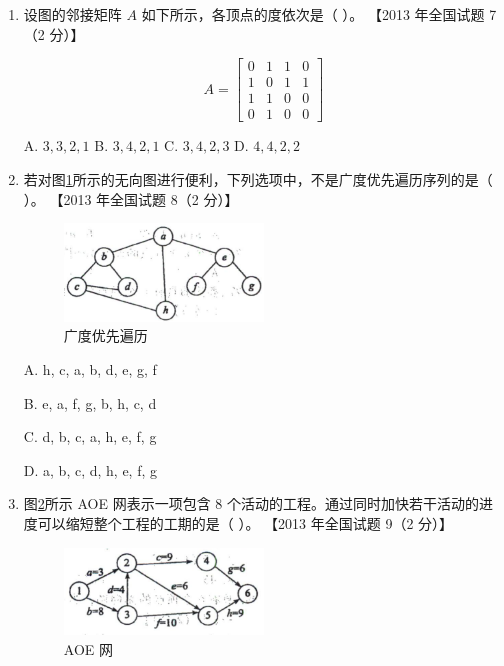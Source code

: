 \documentclass[lang=cn,newtx,10pt,scheme=chinese]{elegantbook}
\begin{document}
\begin{enumerate}
        \item 设图的邻接矩阵 $A$ 如下所示，各顶点的度依次是（ ）。  
        【2013 年全国试题 7（2 分）】  

        \[
        A = 
        \begin{bmatrix}
        0 & 1 & 1 & 0 \\
        1 & 0 & 1 & 1 \\
        1 & 1 & 0 & 0 \\
        0 & 1 & 0 & 0
        \end{bmatrix}
        \]  

        A. $3, 3, 2, 1$ \quad B. $3, 4, 2, 1$ \quad C. $3, 4, 2, 3$ \quad D. $4, 4, 2, 2$  


        \item 若对图\ref{fig:7-17}所示的无向图进行便利，下列选项中，不是广度优先遍历序列的是（ ）。  
        【2013 年全国试题 8（2 分）】  


        \begin{figure}[h!]
            \centering
            \includegraphics[width=0.5\textwidth]{./figure/exercisePicPDF/chapter7/7-17.pdf}
            \caption{广度优先遍历}
            \label{fig:7-17}
    \end{figure}
    A. h, c, a, b, d, e, g, f  

    B. e, a, f, g, b, h, c, d 

    C. d, b, c, a, h, e, f, g  

    D. a, b, c, d, h, e, f, g  
    
        \item 图\ref{fig:7-18}所示 AOE 网表示一项包含 8 个活动的工程。通过同时加快若干活动的进度可以缩短整个工程的工期的是（ ）。  
        【2013 年全国试题 9（2 分）】  

        \begin{figure}[h!]
            \centering
            \includegraphics[width=0.5\textwidth]{./figure/exercisePicPDF/chapter7/7-18.pdf}
            \caption{AOE 网}
            \label{fig:7-18}
    \end{figure}


\end{enumerate}
\end{document}
